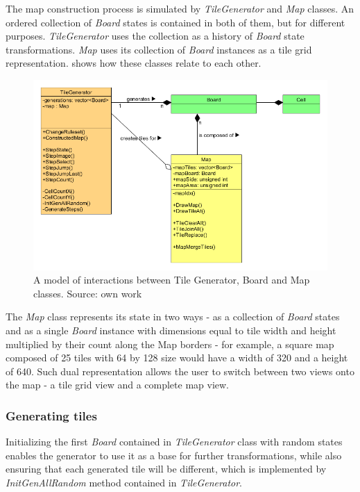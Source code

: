 \documentclass[12pt]{report}
\begin{document}
The map construction process is simulated by \textit{TileGenerator} and \textit{Map} classes. An ordered collection of \textit{Board} states is contained in both of them, but for different purposes. \textit{TileGenerator} uses the collection as a history of \textit{Board} state transformations. \textit{Map} uses its collection of \textit{Board} instances as a tile grid representation.  shows how these classes relate to each other.

\begin{figure}[H]
	\centering
	\includegraphics[width=0.9\linewidth]{diagrams/tilegenerator_map}
	\caption{ A model of interactions between Tile Generator, Board and Map classes. Source: own work}
	\label{fig:tilegeneratormap}
\end{figure}

The \textit{Map} class represents its state in two ways - as a collection of \textit{Board} states and as a single \textit{Board} instance with dimensions equal to tile width and height multiplied by their count along the Map borders - for example, a square map composed of 25 tiles with 64 by 128 size would have a width of 320 and a height of 640. Such dual representation allows the user to switch between two views onto the map - a tile grid view and a complete map view.

\subsubsection{Generating tiles}

Initializing the first \textit{Board} contained in \textit{TileGenerator} class with random states enables the generator to use it as a base for further transformations, while also ensuring that each generated tile will be different, which is implemented by \textit{InitGenAllRandom} method contained in \textit{TileGenerator}.   
\end{document}
